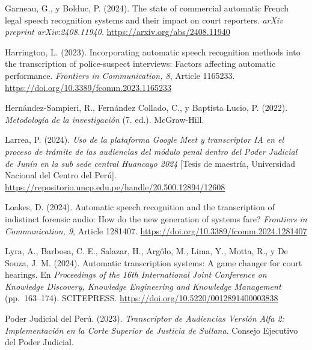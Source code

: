 \documentclass[12pt,a4paper,oneside]{article}
\begin{document}
\begin{enumerate}[label={[\arabic*]}, leftmargin=1.25cm, itemsep=6pt]

  \item Garneau, G., y Bolduc, P. (2024). The state of commercial automatic French legal speech recognition systems and their impact on court reporters. \textit{arXiv preprint arXiv:2408.11940}. \url{https://arxiv.org/abs/2408.11940}

  \item Harrington, L. (2023). Incorporating automatic speech recognition methods into the transcription of police-suspect interviews: Factors affecting automatic performance. \textit{Frontiers in Communication, 8}, Article 1165233. \url{https://doi.org/10.3389/fcomm.2023.1165233}

  \item Hern\'andez-Sampieri, R., Fern\'andez Collado, C., y Baptista Lucio, P. (2022). \textit{Metodolog\'ia de la investigaci\'on} (7.\textordfeminine{} ed.). McGraw-Hill.

  \item Larrea, P. (2024). \textit{Uso de la plataforma Google Meet y transcriptor IA en el proceso de tr\'amite de las audiencias del m\'odulo penal dentro del Poder Judicial de Jun\'in en la sub sede central Huancayo 2024} [Tesis de maestr\'ia, Universidad Nacional del Centro del Per\'u]. \url{https://repositorio.uncp.edu.pe/handle/20.500.12894/12608}

  \item Loakes, D. (2024). Automatic speech recognition and the transcription of indistinct forensic audio: How do the new generation of systems fare? \textit{Frontiers in Communication, 9}, Article 1281407. \url{https://doi.org/10.3389/fcomm.2024.1281407}

  \item Lyra, A., Barbosa, C. E., Salazar, H., Arg\^olo, M., Lima, Y., Motta, R., y De Souza, J. M. (2024). Automatic transcription systems: A game changer for court hearings. En \textit{Proceedings of the 16th International Joint Conference on Knowledge Discovery, Knowledge Engineering and Knowledge Management} (pp.~163--174). SCITEPRESS. \url{https://doi.org/10.5220/0012891400003838}

  \item Poder Judicial del Per\'u. (2023). \textit{Transcriptor de Audiencias Versi\'on Alfa 2: Implementaci\'on en la Corte Superior de Justicia de Sullana}. Consejo Ejecutivo del Poder Judicial.


\end{enumerate}
\end{document}
